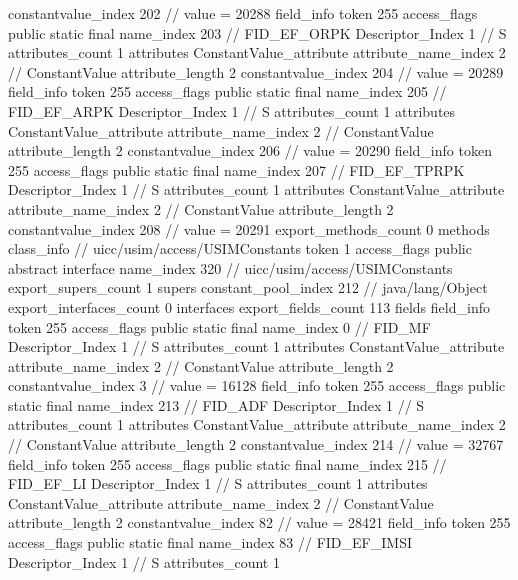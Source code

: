 {{{{{{{					constantvalue_index	202		// value = 20288
				}
				}
			}
			field_info {
				token	255
				access_flags	public static final
				name_index	203		// FID_EF_ORPK
				Descriptor_Index	1		// S
				attributes_count	1
				attributes {
				ConstantValue_attribute {
					attribute_name_index	2		// ConstantValue
					attribute_length	2
					constantvalue_index	204		// value = 20289
				}
				}
			}
			field_info {
				token	255
				access_flags	public static final
				name_index	205		// FID_EF_ARPK
				Descriptor_Index	1		// S
				attributes_count	1
				attributes {
				ConstantValue_attribute {
					attribute_name_index	2		// ConstantValue
					attribute_length	2
					constantvalue_index	206		// value = 20290
				}
				}
			}
			field_info {
				token	255
				access_flags	public static final
				name_index	207		// FID_EF_TPRPK
				Descriptor_Index	1		// S
				attributes_count	1
				attributes {
				ConstantValue_attribute {
					attribute_name_index	2		// ConstantValue
					attribute_length	2
					constantvalue_index	208		// value = 20291
				}
				}
			}
			}
			export_methods_count	0
			methods {
			}
		}
		class_info {		// uicc/usim/access/USIMConstants
			token	1
			access_flags	public abstract interface
			name_index	320		// uicc/usim/access/USIMConstants
			export_supers_count	1
			supers {
				constant_pool_index	212		// java/lang/Object
			}
			export_interfaces_count	0
			interfaces {
			}
			export_fields_count	113
			fields {
			field_info {
				token	255
				access_flags	public static final
				name_index	0		// FID_MF
				Descriptor_Index	1		// S
				attributes_count	1
				attributes {
				ConstantValue_attribute {
					attribute_name_index	2		// ConstantValue
					attribute_length	2
					constantvalue_index	3		// value = 16128
				}
				}
			}
			field_info {
				token	255
				access_flags	public static final
				name_index	213		// FID_ADF
				Descriptor_Index	1		// S
				attributes_count	1
				attributes {
				ConstantValue_attribute {
					attribute_name_index	2		// ConstantValue
					attribute_length	2
					constantvalue_index	214		// value = 32767
				}
				}
			}
			field_info {
				token	255
				access_flags	public static final
				name_index	215		// FID_EF_LI
				Descriptor_Index	1		// S
				attributes_count	1
				attributes {
				ConstantValue_attribute {
					attribute_name_index	2		// ConstantValue
					attribute_length	2
					constantvalue_index	82		// value = 28421
				}
				}
			}
			field_info {
				token	255
				access_flags	public static final
				name_index	83		// FID_EF_IMSI
				Descriptor_Index	1		// S
				attributes_count	1
}}}}}
